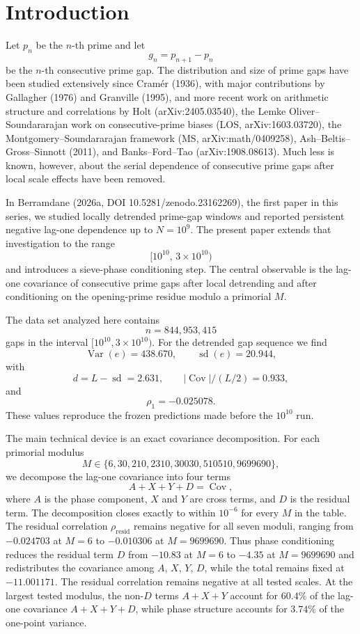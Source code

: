 \section{Introduction}

Let $p_n$ be the $n$-th prime and let
\[
g_n = p_{n+1}-p_n
\]
be the $n$-th consecutive prime gap. The distribution and size of prime gaps have been studied extensively since Cram\'er (1936), with major contributions by Gallagher (1976) and Granville (1995), and more recent work on arithmetic structure and correlations by Holt (arXiv:2405.03540), the Lemke Oliver--Soundararajan work on consecutive-prime biases (LOS, arXiv:1603.03720), the Montgomery--Soundararajan framework (MS, arXiv:math/0409258), Ash--Beltis--Gross--Sinnott (2011), and Banks--Ford--Tao (arXiv:1908.08613). Much less is known, however, about the serial dependence of consecutive prime gaps after local scale effects have been removed.

In Berramdane (2026a, DOI 10.5281/zenodo.23162269), the first paper in this series, we studied locally detrended prime-gap windows and reported persistent negative lag-one dependence up to $N=10^9$. The present paper extends that investigation to the range
\[
[10^{10},\,3\times 10^{10})
\]
and introduces a sieve-phase conditioning step. The central observable is the lag-one covariance of consecutive prime gaps after local detrending and after conditioning on the opening-prime residue modulo a primorial $M$.

The data set analyzed here contains
\[
n = 844{,}953{,}415
\]
gaps in the interval $[10^{10},3\times 10^{10})$. For the detrended gap sequence we find
\[
\operatorname{Var}(e)=438.670,\qquad \operatorname{sd}(e)=20.944,
\]
with
\[
d = L-\operatorname{sd} = 2.631,\qquad
|\operatorname{Cov}|/(L/2)=0.933,
\]
and
\[
\rho_1=-0.025078.
\]
These values reproduce the frozen predictions made before the $10^{10}$ run.

The main technical device is an exact covariance decomposition. For each primorial modulus
\[
M\in\{6,30,210,2310,30030,510510,9699690\},
\]
we decompose the lag-one covariance into four terms
\[
A+X+Y+D=\operatorname{Cov},
\]
where $A$ is the phase component, $X$ and $Y$ are cross terms, and $D$ is the residual term. The decomposition closes exactly to within $10^{-6}$ for every $M$ in the table. The residual correlation $\rho_{\text{resid}}$ remains negative for all seven moduli, ranging from $-0.024703$ at $M=6$ to $-0.010306$ at $M=9699690$. Thus phase conditioning reduces the residual term $D$ from $-10.83$ at $M=6$ to $-4.35$ at $M=9699690$ and redistributes the covariance among $A$, $X$, $Y$, $D$, while the total remains fixed at $-11.001171$. The residual correlation remains negative at all tested scales. At the largest tested modulus, the non-$D$ terms $A+X+Y$ account for $60.4\%$ of the lag-one covariance $A+X+Y+D$, while phase structure accounts for $3.74\%$ of the one-point variance.

